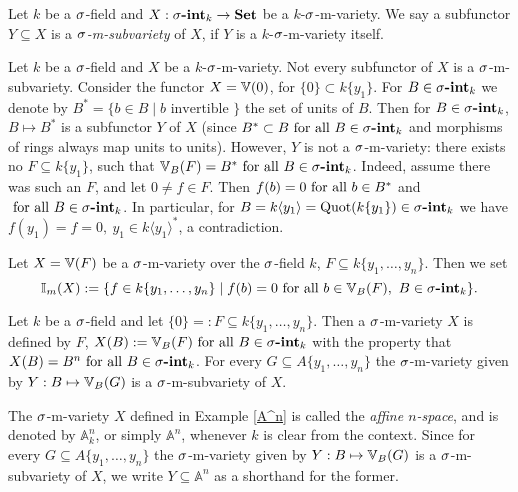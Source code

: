 \begin{defn}
Let $k$ be a $\sigma$-field and $X: \sigma\text{{\normalfont\textbf{-int}}}_k \rightarrow {\normalfont\textbf{Set}}$ be a $k$-$\sigma$-m-variety. We say a subfunctor $Y \subseteq X$ is a \emph{$\sigma$-m-subvariety} of $X$, if $Y$ is a $k$-$\sigma$-m-variety itself. 
\end{defn}

 \begin{rem}
Let $k$ be a $\sigma$-field and $X$ be a $k$-$\sigma$-m-variety. Not every subfunctor of $X$ is a $\sigma$-m-subvariety. Consider the functor $X = \mathbb{V}(0)$, for $\{0\} \subset k\{y_1\}$.
For $B \in \sigma\text{{\normalfont\textbf{-int}}}_k$ we denote by $B^* = \{ b \in B \mid b \text{ invertible } \}$ the set of units of $B$. Then for $B \in \sigma\text{{\normalfont\textbf{-int}}}_k$, $B \mapsto B^*$ is a subfunctor $Y$ of $X$ (since $B^* \subset B \text{ for all } B \in \sigma\text{{\normalfont\textbf{-int}}}_k$ and morphisms of rings always map units to units). However, $Y$ is not a $\sigma$-m-variety:
there exists no $F \subseteq k\{y_1\}$, such that $\mathbb{V}_B(F) = B^* \text{ for all } B \in \sigma\text{{\normalfont\textbf{-int}}}_k$.  Indeed, assume there was such an $F$, and let $0 \neq f \in F$. Then $f(b) = 0 \text{ for all } b \in B^*$ and $\text{ for all } B \in \sigma\text{{\normalfont\textbf{-int}}}_k$. In particular,
for $B = k\langle y_1 \rangle = \operatorname{Quot}(k\{y_1\}) \in \sigma\text{{\normalfont\textbf{-int}}}_k$ we have $f(y_1) = f = 0, ~ y_1 \in k \langle y_1 \rangle^*$, a contradiction.  
\end{rem}

\begin{defn}\label{defnI}
Let $X = \mathbb{V}(F)$ be a $\sigma$-m-variety over the $\sigma$-field $k$, $F \subseteq k\{y_1,\ldots,y_n\}$. Then we set $$\mathbb{I}_m(X):= \{ f \in k\{y_1,\ldots,y_n\} \mid f(b) = 0 \text{ for all } b \in \mathbb{V}_B(F), ~ B \in \sigma\text{{\normalfont\textbf{-int}}}_k \}.$$ 
\end{defn}

\begin{ex}\label{A^n}
Let $k$ be a $\sigma$-field and let $\{ 0 \} =: F \subseteq k\{y_1,\ldots,y_n\}$. Then a $\sigma$-m-variety $X$ is defined by $F$, $X(B) := \mathbb{V}_B(F) \text{ for all } B \in \sigma\text{{\normalfont\textbf{-int}}}_k$ with the property that $X(B) = B^n \text{ for all } B \in \sigma\text{{\normalfont\textbf{-int}}}_k$.
For every $G \subseteq A\{y_1,\ldots,y_n\}$ the $\sigma$-m-variety given by $Y: B \mapsto \mathbb{V}_B(G)$ is a $\sigma$-m-subvariety of $X$. 
\end{ex}

\begin{defn}\label{defA^n}
The $\sigma$-m-variety $X$ defined in Example \ref{A^n} is called the \emph{affine $n$-space}, and is denoted by $\mathbb{A}^n_k$, 
or simply $\mathbb{A}^n$, whenever $k$ is clear from the context.   
Since for every $G \subseteq A\{y_1,\ldots,y_n\}$ the $\sigma$-m-variety given by $Y: B \mapsto \mathbb{V}_B(G)$ is a $\sigma$-m-subvariety of $X$, 
we write $Y \subseteq \mathbb{A}^n$ as a shorthand for the former.
\end{defn}

